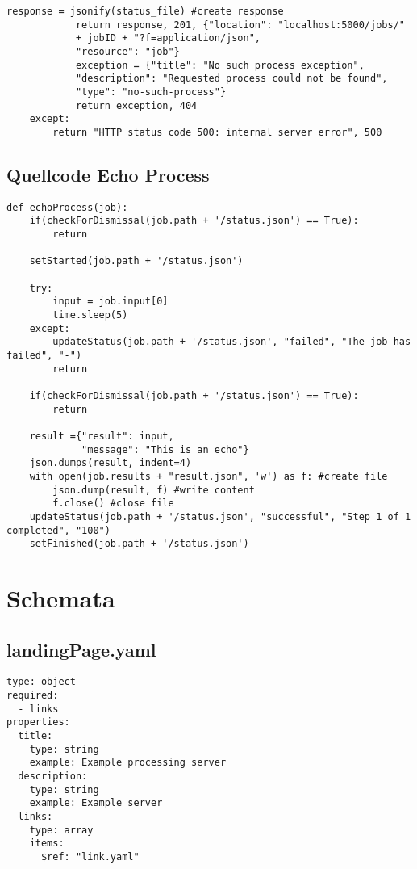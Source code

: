 \begin{lstlisting}[caption={Process Execution}, style = Python]
            response = jsonify(status_file) #create response
            return response, 201, {"location": "localhost:5000/jobs/" 
            + jobID + "?f=application/json", 
            "resource": "job"} 
            exception = {"title": "No such process exception", 
            "description": "Requested process could not be found", 
            "type": "no-such-process"}
            return exception, 404 
    except:
        return "HTTP status code 500: internal server error", 500
\end{lstlisting}\label{appendixProcessExecution}   

\newpage
\subsection{Quellcode Echo Process}
\begin{lstlisting}[caption={Echo Process}, style = Python]
def echoProcess(job):
    if(checkForDismissal(job.path + '/status.json') == True):
        return
    
    setStarted(job.path + '/status.json')
    
    try:
        input = job.input[0]
        time.sleep(5)
    except:
        updateStatus(job.path + '/status.json', "failed", "The job has failed", "-")
        return
    
    if(checkForDismissal(job.path + '/status.json') == True):
        return
    
    result ={"result": input,
             "message": "This is an echo"}
    json.dumps(result, indent=4)
    with open(job.results + "result.json", 'w') as f: #create file
        json.dump(result, f) #write content
        f.close() #close file
    updateStatus(job.path + '/status.json', "successful", "Step 1 of 1 completed", "100")
    setFinished(job.path + '/status.json')
\end{lstlisting}\label{appendixEchoProcess}  

\section{Schemata}
\renewcommand{\lstlistingname}{Schema}
\subsection{landingPage.yaml}
\begin{lstlisting}[caption={landingPage.yaml}]
type: object
required:
  - links
properties:
  title:
    type: string
    example: Example processing server
  description:
    type: string
    example: Example server 
  links:
    type: array
    items:
      $ref: "link.yaml"
\end{lstlisting}\label{appendixlandngPageyaml}  

